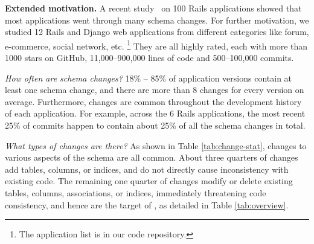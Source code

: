 


\textbf{Extended motivation.}
A recent study~\cite{wang2017verifying} on 100 Rails applications 
showed that most applications went through many schema changes.
For further motivation, we studied
12 Rails and Django web applications from different categories like forum, e-commerce, social network, etc. \footnote{The application list is in our code
repository.} They are all highly rated, each with
more than 1000 stars on GitHub, 11,000--900,000 lines of code and 500--100,000 commits. 


% 

\textit{How often are schema changes?} 18\% -- 85\% of application versions
contain at least one schema change, and there are more than 8 changes for every
version on average.
Furthermore, changes are common throughout the development history of each
application. For example, across the 6 Rails applications, the most recent 25\%
of commits happen to contain about 25\% of all the schema
changes in total.


\textit{What types of changes are there?} As shown in Table \ref{tab:change-stat},
 changes to various aspects of the schema
are all common.
About three quarters of changes add tables, columns, or indices, and
do not directly cause inconsistency with existing code. The remaining
one quarter of changes modify or delete existing tables, columns,
associations, or indices, immediately threatening code consistency, and hence
are the target of \Tool, as detailed
in Table \ref{tab:overview}.


